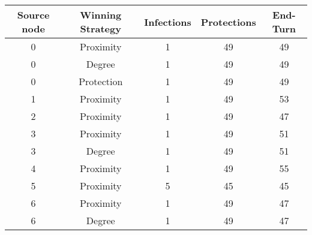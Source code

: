 \documentclass[results.tex]{subfiles}
\begin{document}
    \begin{center}
        \begin{tabular}{| c || c | c | c | c |}
            \hline
            {\bfseries Source node} & {\bfseries Winning Strategy} & {\bfseries Infections} & {\bfseries Protections}
            & {\bfseries End-Turn}
            \\  %
            \hline\hline
            0                       & Proximity                    & 1                      & 49                      & 49                   \\
            \hline
            0                       & Degree                       & 1                      & 49                      & 49                   \\
            \hline
            0                       & Protection                   & 1                      & 49                      & 49                   \\
            \hline
            1                       & Proximity                    & 1                      & 49                      & 53                   \\
            \hline
            2                       & Proximity                    & 1                      & 49                      & 47                   \\
            \hline
            3                       & Proximity                    & 1                      & 49                      & 51                   \\
            \hline
            3                       & Degree                       & 1                      & 49                      & 51                   \\
            \hline
            4                       & Proximity                    & 1                      & 49                      & 55                   \\
            \hline
            5                       & Proximity                    & 5                      & 45                      & 45                   \\
            \hline
            6                       & Proximity                    & 1                      & 49                      & 47                   \\
            \hline
            6                       & Degree                       & 1                      & 49                      & 47                   \\

\end{tabular}
\end{center}
\end{document}
